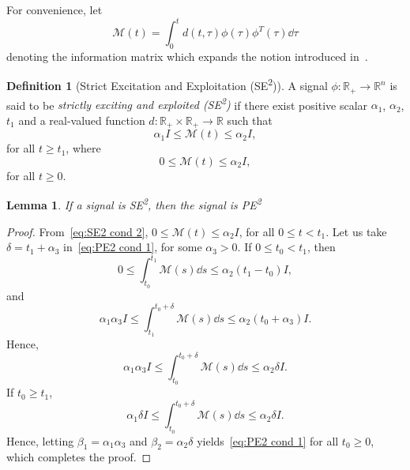 \documentclass[]{IEEEtran}
\newtheorem{lemma}{Lemma}
\theoremstyle{definition}
\newtheorem{definition}{Definition}
\theoremstyle{remark}
\newcommand{\MB}[1]{\mathbb{#1}}
\newcommand{\MC}[1]{\mathcal{#1}}
\newcommand{\tsup}[1]{\textsuperscript{#1}}
\begin{document}
For convenience, let
\begin{equation}\label{eq:information matrix}
	\MC{M}(t) = \int_0^t d(t, \tau) \phi(\tau) \phi^T(\tau) \dd{\tau}
\end{equation}
denoting the information matrix which expands the notion introduced
in~\cite{cho_composite_2018}.

\begin{definition}[Strict Excitation and Exploitation (SE\tsup{2})]
	A signal $\phi: \MB{R}_{+} \to \MB{R}^n$ is said to be \textit{strictly
	exciting and exploited (SE\tsup{2})} if there exist positive
	scalar $\alpha_1$, $\alpha_2$, $t_1$ and a real-valued function $d :
	\MB{R}_{+} \times \MB{R}_{+} \to \MB{R}$ such that
	\begin{equation}\label{eq:SE2 cond 1}
		\alpha_1 I \le \MC{M}(t) \le \alpha_2 I,
	\end{equation}
	for all $t \ge t_1$, where
	\begin{equation}\label{eq:SE2 cond 2}
		0 \le \MC{M}(t) \le \alpha_2 I,
	\end{equation}
	for all $t \ge 0$.
\end{definition}

\begin{lemma}\label{lem:SE2 then PE2}
	If a signal is SE\tsup{2}, then the signal is PE\tsup{2}
\end{lemma}

\begin{proof}
	From~\eqref{eq:SE2 cond 2}, $0 \le \MC{M}(t) \le \alpha_2 I$, for all $0 \le
	t < t_1$. Let us take $\delta = t_1 + \alpha_3$ in~\eqref{eq:PE2 cond 1}, for
	some $\alpha_3 > 0$. If $0 \le t_0 < t_1$, then
	\begin{equation*}
		0 \le \int_{t_0}^{t_1} {\MC{M}(s)} \dd{s} \le \alpha_2 (t_1 - t_0) I,
	\end{equation*}
	and
	\begin{equation*}
		\alpha_1 \alpha_3 I \le \int_{t_1}^{t_0 + \delta} {\MC{M}(s)} \dd{s} \le
		\alpha_2 (t_0 + \alpha_3) I.
	\end{equation*}
	Hence,
	\begin{equation*}
		\alpha_1 \alpha_3 I \le \int_{t_0}^{t_0 + \delta} {\MC{M}(s)} \dd{s} \le
		\alpha_2 \delta I.
	\end{equation*}
	If $t_0 \ge t_1$,
	\begin{equation*}
		\alpha_1 \delta I \le \int_{t_0}^{t_0 + \delta} {\MC{M}(s)} \dd{s} \le
		\alpha_2 \delta I.
	\end{equation*}
	Hence, letting $\beta_1 = \alpha_1 \alpha_3$ and $\beta_2 = \alpha_2 \delta$
	yields~\eqref{eq:PE2 cond 1} for all $t_0 \ge 0$, which completes the proof.
\end{proof}
\end{document}
